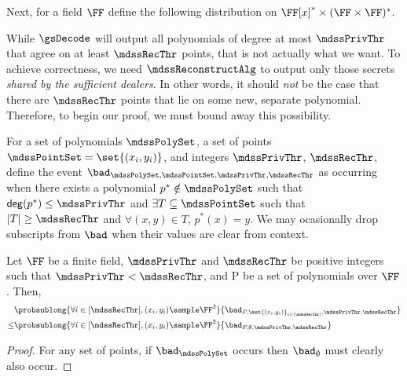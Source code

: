 Next, for a field $\FF$ define the following distribution on $\FF[x]^* \times (\FF \times \FF)^*$.


\newcommand{\mdssFieldBound}{\ensuremath{\left( \frac{1}{|\FF|} \right)^{\mdssRecThr - (\mdssPrivThr + 1)}}}


While $\gsDecode$ will output all polynomials of degree at most $\mdssPrivThr$ that agree on at least $\mdssRecThr$ points, that is not actually what we want.
To achieve correctness, we need $\mdssReconstructAlg$ to output only those secrets \emph{shared by the sufficient dealers}.
In other words, it should \emph{not} be the case that there are $\mdssRecThr$ points that lie on some new, separate polynomial.
Therefore, to begin our proof, we must bound away this possibility.

For a set of polynomials $\mdssPolySet$, a set of points $\mdssPointSet = \set{(x_i, y_i)}$, and integers $\mdssPrivThr$, $\mdssRecThr$, define the event $\bad_{\mdssPolySet, \mdssPointSet, \mdssPrivThr, \mdssRecThr}$ as occurring when there exists a polynomial $p^* \notin \mdssPolySet$ such that $\mathsf{deg}(p^*) \leq \mdssPrivThr$ and $\exists T \subseteq \mdssPointSet$ such that $|T| \geq \mdssRecThr$ and $\forall (x, y) \in T$, $p^*(x) = y$.
We may ocasionally drop subscripts from $\bad$ when their values are clear from context.

\begin{lemma}
	\label{lem:mdss-bad-with-polys}
	Let $\FF$ be a finite field, $\mdssPrivThr$ and $\mdssRecThr$ be positive integers such that $\mdssPrivThr < \mdssRecThr$, and P be a set of polynomials over $\FF$. Then,
	\begin{align*}
		     & \probsublong{\forall i \in [\mdssRecThr], (x_i, y_i) \sample \FF^2}{\bad_{P, \set{(x_i, y_i)}_{i \in [\mdssRecThr]}, \mdssPrivThr, \mdssRecThr}} \\
		\leq & \probsublong{\forall i \in [\mdssRecThr], (x_i, y_i) \sample \FF^2}{\bad_{P, \emptyset, \mdssPrivThr, \mdssRecThr}}
	\end{align*}
\end{lemma}
\begin{proof}
	For any set of points, if $\bad_{\mdssPolySet}$ occurs then $\bad_{\emptyset}$ must clearly also occur.
\end{proof}

